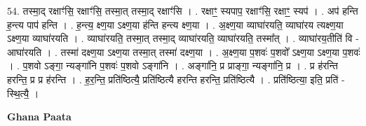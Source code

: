\documentclass[17pt]{extarticle}
\begin{document}
54. तस्मा॒द् रक्षाꣳ॑सि॒ रक्षाꣳ॑सि॒ तस्मा॒त् तस्मा॒द् रक्षाꣳ॑सि । . रक्षाꣳ॒॒ स्यपाप॒ रक्षाꣳ॑सि॒ रक्षाꣳ॒॒ स्यप॑ । . अप॑ हन्ति ह॒न्त्य पाप॑ हन्ति । . ह॒न्त्य॒ क्ष्ण॒या ऽक्ष्ण॒या ह॑न्ति हन्त्य क्ष्ण॒या । . अ॒क्ष्ण॒या व्याघा॑रयति॒ व्याघा॑रय त्यक्ष्ण॒या ऽक्ष्ण॒या व्याघा॑रयति । . व्याघा॑रयति॒ तस्मा॒त् तस्मा॒द् व्याघा॑रयति॒ व्याघा॑रयति॒ तस्मा᳚त् । . व्याघा॑रय॒तीति॑ वि - आघा॑रयति । . तस्मा॑ दक्ष्ण॒या ऽक्ष्ण॒या तस्मा॒त् तस्मा॑ दक्ष्ण॒या । . अ॒क्ष्ण॒या प॒शवः॑ प॒शवो᳚ ऽक्ष्ण॒या ऽक्ष्ण॒या प॒शवः॑ । . प॒शवो ऽङ्गा॒ न्यङ्गा॑नि प॒शवः॑ प॒शवो ऽङ्गा॑नि । . अङ्गा॑नि॒ प्र प्राङ्गा॒ न्यङ्गा॑नि॒ प्र । . प्र ह॑रन्ति हरन्ति॒ प्र प्र ह॑रन्ति । . ह॒र॒न्ति॒ प्रति॑ष्ठित्यै॒ प्रति॑ष्ठित्यै हरन्ति हरन्ति॒ प्रति॑ष्ठित्यै । . प्रति॑ष्ठित्या॒ इति॒ प्रति॑ - स्थि॒त्यै॒ । \newline

\textbf{Ghana Paata } \newline
\end{document}
